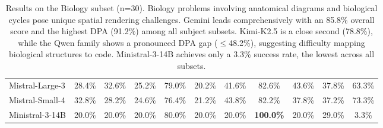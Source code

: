 \documentclass[11pt]{article}
\begin{document}
\begin{table}[!ht]
{\begin{tabular}{lcccc|cccc|cc}
Mistral-Large-3        & 28.4\% & 32.6\% & 25.2\% & 79.0\% & 20.2\% & 41.6\% & 82.6\% & 43.6\% & 37.8\% & 63.3\% \\
Mistral-Small-4        & 32.8\% & 28.2\% & 24.6\% & 76.4\% & 21.2\% & 43.8\% & 82.2\% & 37.8\% & 37.2\% & 73.3\% \\
Ministral-3-14B        & 20.0\% & 20.0\% & 20.0\% & 80.0\% & 20.0\% & 20.0\% & \textbf{100.0\%} & 20.0\% & 29.0\% & 3.3\% \\
\bottomrule
\end{tabular}}
\caption{Results on the Biology subset (n=30). Biology problems involving anatomical diagrams and biological cycles pose unique spatial rendering challenges. Gemini leads comprehensively with an 85.8\% overall score and the highest DPA (91.2\%) among all subject subsets. Kimi-K2.5 is a close second (78.8\%), while the Qwen family shows a pronounced DPA gap ($\leq$48.2\%), suggesting difficulty mapping biological structures to code. Ministral-3-14B achieves only a 3.3\% success rate, the lowest across all subsets.}
\label{tab:results-biology}
\end{table}
\end{document}
